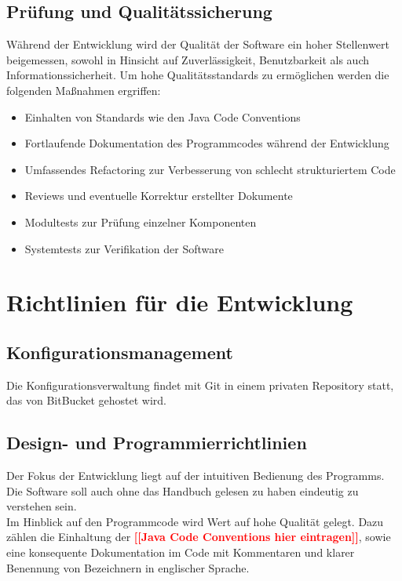 \documentclass[11pt]{article}
\begin{document}
\subsection{Prüfung und Qualitätssicherung}

Während der Entwicklung wird der Qualität der Software ein hoher Stellenwert beigemessen, sowohl in Hinsicht auf Zuverlässigkeit, Benutzbarkeit als auch Informationssicherheit. Um hohe Qualitätsstandards zu ermöglichen werden die folgenden Maßnahmen ergriffen:
\begin{itemize}
	\item Einhalten von Standards wie den Java Code Conventions
	\item Fortlaufende Dokumentation des Programmcodes während der Entwicklung
	\item Umfassendes Refactoring zur Verbesserung von schlecht strukturiertem Code
	\item Reviews und eventuelle Korrektur erstellter Dokumente
	\item Modultests zur Prüfung einzelner Komponenten
	\item Systemtests zur Verifikation der Software
\end{itemize}

\section{Richtlinien für die Entwicklung}

\subsection{Konfigurationsmanagement}

Die Konfigurationsverwaltung findet mit Git in einem privaten Repository statt, das von BitBucket gehostet wird.

\subsection{Design- und Programmierrichtlinien}

Der Fokus der Entwicklung liegt auf der intuitiven Bedienung des Programms. Die Software soll auch ohne das Handbuch gelesen zu haben eindeutig zu verstehen sein.\\
Im Hinblick auf den Programmcode wird Wert auf hohe Qualität gelegt. Dazu zählen die Einhaltung der \textbf{\textcolor{red}{[[Java Code Conventions hier eintragen]]}}, sowie eine konsequente Dokumentation im Code mit Kommentaren und klarer Benennung von Bezeichnern in englischer Sprache.
\end{document}
